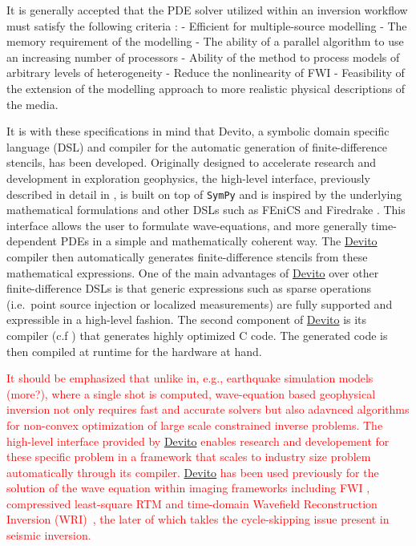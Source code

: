 \documentclass[10pt, conference]{IEEEtran}
\newcommand{\devito}{\href{https://github.com/devitocodes/devito}{Devito} }
\begin{document}
It is generally accepted that the PDE solver utilized within an
inversion workflow must satisfy the following criteria
\cite{virieuxmodelling}: - Efficient for multiple-source modelling - The
memory requirement of the modelling - The ability of a parallel algorithm
to use an increasing number of processors - Ability of the method to
process models of arbitrary levels of heterogeneity - Reduce the
nonlinearity of FWI - Feasibility of the extension of the modelling
approach to more realistic physical descriptions of the media.

It is with these specifications in mind that Devito, a symbolic domain
specific language (DSL) and compiler for the automatic generation of
finite-difference stencils, has been developed. Originally designed to
accelerate research and development in exploration geophysics, the
high-level interface, previously described in detail in \cite{devito-api},
is built on top of \texttt{SymPy} \cite{sympy} and is inspired by the
underlying mathematical formulations and other DSLs such as FEniCS
\cite{fenics} and Firedrake \cite{firedrake}. This interface allows the
user to formulate wave-equations, and more generally time-dependent PDEs
in a simple and mathematically coherent way. The \devito compiler then
automatically generates finite-difference stencils from these mathematical
expressions. One of the main advantages of \devito over other
finite-difference DSLs is that generic expressions such as sparse
operations (i.e.~point source injection or localized measurements) are
fully supported and expressible in a high-level fashion. The second
component of \devito is its compiler (c.f \cite{devito-compiler}) that
generates highly optimized C code. The generated code is then compiled at
runtime for the hardware at hand.

\textcolor{red}{It should be emphasized that unlike in,
e.g., earthquake simulation models \cite{fu201718} (more?), where
a single shot is computed, wave-equation based
geophysical inversion not only requires
fast and accurate solvers but also adavnced algorithms for
non-convex optimization of large scale constrained inverse problems. The 
high-level interface provided by \devito enables research and developement for these 
specific problem in a framework that scales to industry size problem 
automatically through its compiler. \devito has been used previously
for the solution of the wave equation within imaging frameworks including
FWI \cite{witte2018alf}, compressived least-square RTM \cite{witte2018cls} and
time-domain Wavefield Reconstruction Inversion (WRI)~\cite{rizzuti2020EAGEtwri, 
louboutin2020SEGtwri}, the later of which takles the cycle-skipping issue
present in seismic inversion.}
\end{document}
